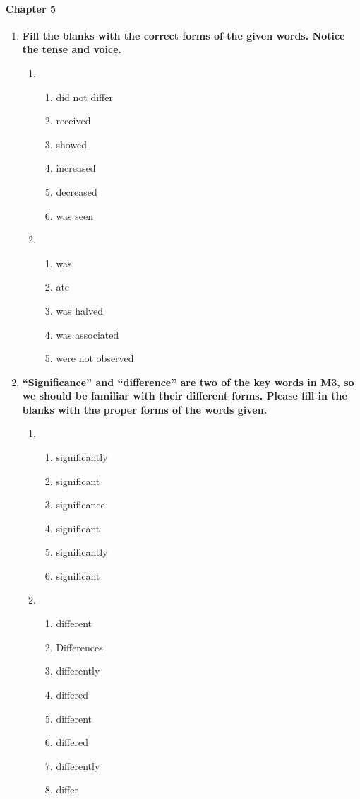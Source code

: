 \documentclass{ctexbook}
\begin{document}
\paragraph*{Chapter 5}\par
\begin{enumerate}
  \item \textbf{Fill the blanks with the correct forms of the given words. Notice the tense and voice.}
  \begin{enumerate}
    \item ~
    \begin{enumerate}
      \item did not differ
      \item received
      \item showed
      \item increased
      \item decreased
      \item was seen
    \end{enumerate}
    
    \item ~
    \begin{enumerate}
      \item was
      \item ate
      \item was halved
      \item was associated
      \item were not observed
    \end{enumerate}
  \end{enumerate}

  \item \textbf{``Significance'' and ``difference'' are two of the key words in M3, so we should be familiar with their different forms. Please fill in the blanks with the proper forms of the words given.}
  \begin{enumerate}
    \item ~
    \begin{enumerate}
      \item significantly
      \item significant
      \item significance
      \item significant
      \item significantly
      \item significant
    \end{enumerate}

    \item ~
    \begin{enumerate}
      \item different
      \item Differences
      \item differently
      \item differed
      \item different
      \item differed
      \item differently
      \item differ
    \end{enumerate}
  \end{enumerate}
\end{enumerate}
\end{document}
